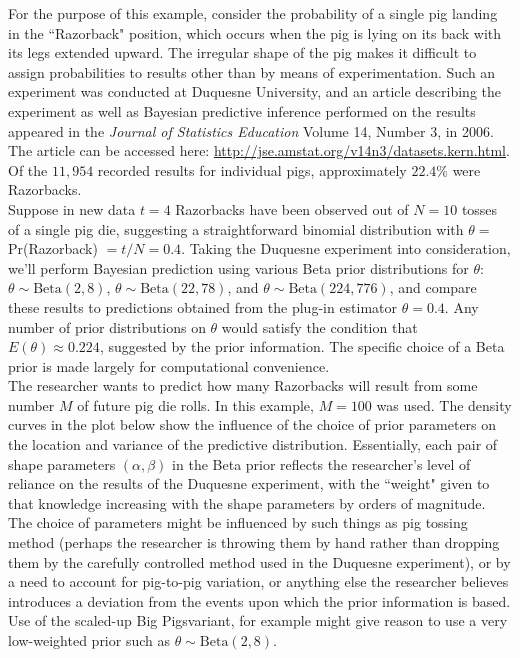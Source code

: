 \documentclass[12pt, a4paper]{article}
\begin{document}
\noindent For the purpose of this example, consider the probability of a single pig landing in the ``Razorback" position, which occurs when the pig is lying on its back with its legs extended upward.  The irregular shape of the pig makes it difficult to assign probabilities to results other than by means of experimentation.  Such an experiment was conducted at Duquesne University, and an article describing the experiment as well as Bayesian predictive inference performed on the results appeared in the \textit{Journal of Statistics Education} Volume 14, Number 3, in 2006.  The article can be accessed here:  \url{http://jse.amstat.org/v14n3/datasets.kern.html}. Of the $11,954$ recorded results for individual pigs, approximately $22.4\%$ were Razorbacks.\\

\noindent Suppose in new data $t=4$ Razorbacks have been observed out of $N=10$ tosses of a single pig die, suggesting a straightforward binomial distribution with $\theta =$ Pr(Razorback) $= t/N = 0.4$. Taking the Duquesne experiment into consideration, we'll perform Bayesian prediction using various Beta prior distributions for $\theta$: $\theta\sim\text{Beta}(2,8)$, $\theta\sim\text{Beta}(22,78)$, and $\theta\sim\text{Beta}(224,776)$, and compare these results to predictions obtained from the plug-in estimator $\theta = 0.4$.   Any number of prior distributions on $\theta$ would satisfy the condition that $E(\theta) \approx 0.224$, suggested by the prior information.  The specific choice of a Beta prior is made largely for computational convenience.\\

\noindent The researcher wants to predict how many Razorbacks will result from some number $M$ of future pig die rolls.  In this example, $M=100$ was used.  The density curves in the plot below show the influence of the choice of prior parameters on the location and variance of the predictive distribution.  Essentially, each pair of shape parameters $(\alpha,\beta)$ in the Beta prior reflects the researcher's level of reliance on the results of the Duquesne experiment, with the ``weight" given to that knowledge increasing with the shape parameters by orders of magnitude.  The choice of parameters might be influenced by such things as pig tossing method (perhaps the researcher is throwing them by hand rather than dropping them by the carefully controlled method used in the Duquesne experiment), or by a need to account for pig-to-pig variation, or anything else the researcher believes introduces a deviation from the events upon which the prior information is based.  Use of the scaled-up Big Pigs\texttrademark variant, for example might give reason to use a very low-weighted prior such as $\theta\sim\text{Beta}(2,8)$.
\end{document}
